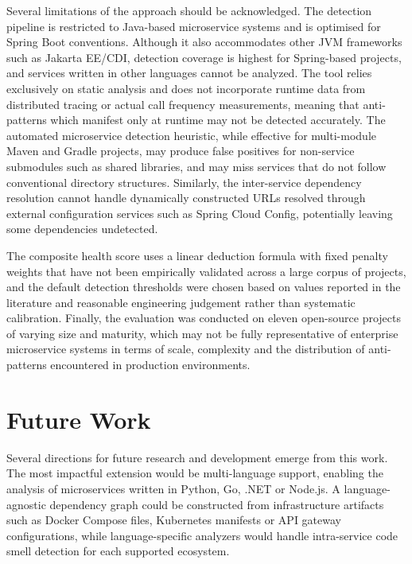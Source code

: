 \par Several limitations of the approach should be acknowledged. The detection pipeline is restricted to Java-based microservice systems and is optimised for Spring Boot conventions. Although it also accommodates other JVM frameworks such as Jakarta EE/CDI, detection coverage is highest for Spring-based projects, and services written in other languages cannot be analyzed. The tool relies exclusively on static analysis and does not incorporate runtime data from distributed tracing or actual call frequency measurements, meaning that anti-patterns which manifest only at runtime may not be detected accurately. The automated microservice detection heuristic, while effective for multi-module Maven and Gradle projects, may produce false positives for non-service submodules such as shared libraries, and may miss services that do not follow conventional directory structures. Similarly, the inter-service dependency resolution cannot handle dynamically constructed URLs resolved through external configuration services such as Spring Cloud Config, potentially leaving some dependencies undetected.

\par The composite health score uses a linear deduction formula with fixed penalty weights that have not been empirically validated across a large corpus of projects, and the default detection thresholds were chosen based on values reported in the literature and reasonable engineering judgement rather than systematic calibration. Finally, the evaluation was conducted on eleven open-source projects of varying size and maturity, which may not be fully representative of enterprise microservice systems in terms of scale, complexity and the distribution of anti-patterns encountered in production environments.

\section{Future Work}
\label{sec:future-work}

\par Several directions for future research and development emerge from this work. The most impactful extension would be multi-language support, enabling the analysis of microservices written in Python, Go, .NET or Node.js. A language-agnostic dependency graph could be constructed from infrastructure artifacts such as Docker Compose files, Kubernetes manifests or API gateway configurations, while language-specific analyzers would handle intra-service code smell detection for each supported ecosystem.


